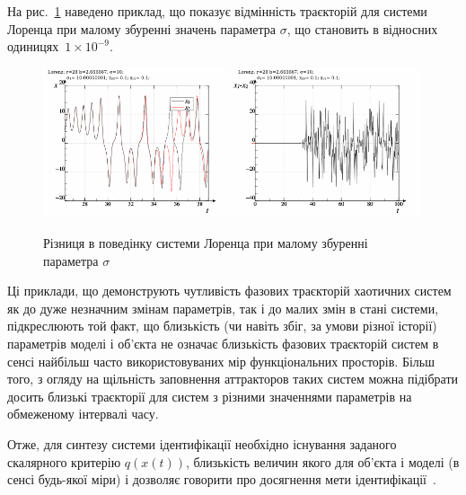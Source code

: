 На рис.~\ref{atu:f:lor_diff_sigma} наведено приклад, що показує відмінність
траєкторій для системи Лоренца при малому збуренні значень
параметра
$ \sigma $, що становить в відносних одиницях~$ 1 \times 10^{-9} $.

\begin{figure}[htb!]
  \begin{center}
    \includegraphics[width=0.49\textwidth]{p/lor_diff-p_xx_sigma.png}
    \hfill
    \includegraphics[width=0.49\textwidth]{p/lor_diff-p_dx_sigma.png}
  \end{center}
  \caption{Різниця в поведінку системи Лоренца при малому збуренні параметра $ \sigma $}
  \label{atu:f:lor_diff_sigma}
\end{figure}

Ці приклади, що демонструють чутливість фазових траєкторій
хаотичних систем як до дуже незначним змінам параметрів,
так і до малих змін в стані системи, підкреслюють той факт, що
близькість (чи навіть збіг, за умови різної історії) параметрів
моделі і об'єкта не означає близькість фазових траєкторій
систем в сенсі найбільш часто використовуваних мір
функціональних просторів. Більш того, з огляду на щільність
заповнення аттракторов таких систем можна підібрати досить
близькі траєкторії для систем з різними значеннями параметрів
на обмеженому інтервалі часу.

Отже, для синтезу системи ідентифікації необхідно існування заданого скалярного
критерію $q(x(t))$, близькість величин якого для об'єкта і моделі (в сенсі
будь-якої міри) і дозволяє говорити про досягнення мети ідентифікації~\cite{crit_method_is}.


